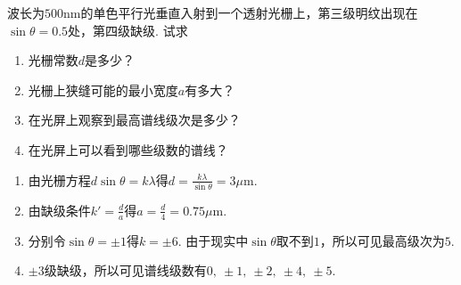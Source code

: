 \begin{problem}[光栅]
    波长为$500\mathrm{nm}$的单色平行光垂直入射到一个透射光栅上，第三级明纹出现在$\sin\theta=0.5$处，第四级缺级. 试求
\begin{enumerate}
    \item 光栅常数$d$是多少？
    \item 光栅上狭缝可能的最小宽度$a$有多大？
    \item 在光屏上观察到最高谱线级次是多少？
    \item 在光屏上可以看到哪些级数的谱线？
\end{enumerate}
\end{problem}
\begin{solution}
\begin{enumerate}
    \item 由光栅方程$d\sin\theta=k\lambda$得$d=\frac{k\lambda}{\sin\theta}=3\mu\mathrm{m}$.
    \item 由缺级条件$k'=\frac da$得$a=\frac d4=0.75\mu\mathrm{m}$.
    \item 分别令$\sin\theta=\pm 1$得$k=\pm 6$. 由于现实中$\sin\theta$取不到$1$，所以可见最高级次为$5$.
    \item $\pm 3$级缺级，所以可见谱线级数有$0,\ \pm1,\ \pm2,\ \pm4,\ \pm5$.
\end{enumerate}
\end{solution}

